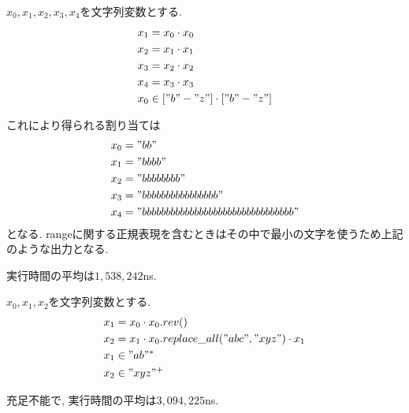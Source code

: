\documentclass[uplatex,dvipdfmx,a4j]{jsreport}
\begin{document}
  \begin{example}
    $x_0, x_1, x_2, x_3, x_4$を文字列変数とする.
    \begin{align*}
      x_1 &= x_0 \cdot x_0 \\
      x_2 &= x_1 \cdot x_1 \\
      x_3 &= x_2 \cdot x_2 \\
      x_4 &= x_3 \cdot x_3 \\
      x_0 &\in ["b" - "z"] \cdot ["b" - "z"]
    \end{align*}

    これにより得られる割り当ては
    \begin{align*}
      x_0 &= "bb" \\
      x_1 &= "bbbb" \\
      x_2 &= "bbbbbbbb" \\
      x_3 &= "bbbbbbbbbbbbbbbb" \\
      x_4 &= "bbbbbbbbbbbbbbbbbbbbbbbbbbbbbbbb"
    \end{align*}
    となる.
    rangeに関する正規表現を含むときはその中で最小の文字を使うため上記のような出力となる.

    実行時間の平均は$1,538,242$ns.
  \end{example}

  \begin{example}
    $x_0, x_1, x_2$を文字列変数とする.
    \begin{align*}
      x_1 &= x_0 \cdot x_0.rev() \\
      x_2 &= x_1 \cdot x_0.replace\_all("abc", "xyz") \cdot x_1  \\
      x_1 &\in "ab"^* \\
      x_2 &\in "xyz"^+
    \end{align*}

    充足不能で, 実行時間の平均は$3,094,225$ns.
  \end{example}
\end{document}

